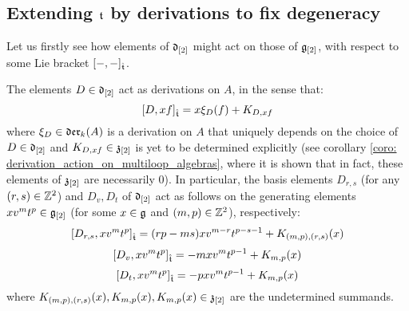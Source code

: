     \subsection{Extending \texorpdfstring{$\mathfrak{t}$}{} by derivations to fix degeneracy}
        Let us firstly see how elements of $\mathfrak{d}_{[2]}$ might act on those of $\mathfrak{g}_{[2]}$, with respect to some Lie bracket $[-, -]_{\hat{\mathfrak{t}}}$. 
        \begin{lemma} \label{lemma: derivation_action_on_multiloop_algebras}
            The elements $D \in \mathfrak{d}_{[2]}$ act as derivations on $A$, in the sense that:
                $$[D, xf]_{\hat{\mathfrak{t}}} = x \xi_D(f) + K_{D, xf}$$
            where $\xi_D \in \mathfrak{der}_k(A)$ is a derivation on $A$ that uniquely depends on the choice of $D \in \mathfrak{d}_{[2]}$ and $K_{D, xf} \in \mathfrak{z}_{[2]}$ is yet to be determined explicitly (see corollary \ref{coro: derivation_action_on_multiloop_algebras}, where it is shown that in fact, these elements of $\mathfrak{z}_{[2]}$ are necessarily $0$). In particular, the basis elements $D_{r, s}$ (for any $(r, s) \in \mathbb{Z}^2$) and $D_v, D_t$ of $\mathfrak{d}_{[2]}$ act as follows on the generating elements $x v^m t^p \in \mathfrak{g}_{[2]}$ (for some $x \in \mathfrak{g}$ and $(m, p) \in \mathbb{Z}^2$), respectively:
                $$[D_{r, s}, x v^m t^p]_{\hat{\mathfrak{t}}} = ( rp - ms ) x v^{m - r} t^{p - s - 1} + K_{(m, p), (r, s)}(x)$$
                $$[D_v, x v^m t^p]_{\hat{\mathfrak{t}}} = -m x v^m t^{p - 1} + K_{m, p}(x)$$
                $$[D_t, x v^m t^p]_{\hat{\mathfrak{t}}} = -p x v^m t^{p - 1} + K_{m, p}(x)$$
            where $K_{(m, p), (r, s)}(x), K_{m, p}(x), K_{m, p}(x) \in \mathfrak{z}_{[2]}$ are the undetermined summands.
        \end{lemma}
